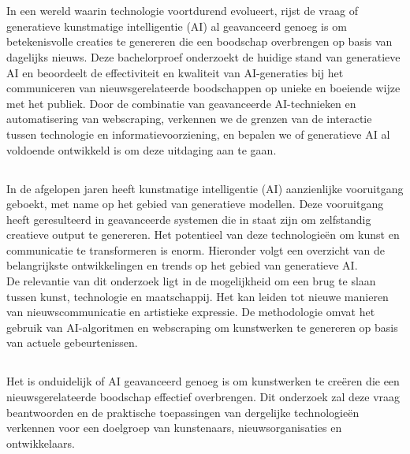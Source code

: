 
\chapter{}%
\label{ch:inleiding}

\noindent
In een wereld waarin technologie voortdurend evolueert, rijst de vraag of generatieve kunstmatige intelligentie (AI) al geavanceerd genoeg is om betekenisvolle creaties te genereren die een boodschap overbrengen op basis van dagelijks nieuws. Deze bachelorproef onderzoekt de huidige stand van generatieve AI en beoordeelt de effectiviteit en kwaliteit van AI-generaties bij het communiceren van nieuwsgerelateerde boodschappen op unieke en boeiende wijze met het publiek. Door de combinatie van geavanceerde AI-technieken en automatisering van webscraping, verkennen we de grenzen van de interactie tussen technologie en informatievoorziening, en bepalen we of generatieve AI al voldoende ontwikkeld is om deze uitdaging aan te gaan.
\pagebreak


\section{}%
\label{sec:context}
\noindent
In de afgelopen jaren heeft kunstmatige intelligentie (AI) aanzienlijke vooruitgang geboekt, met name op het gebied van generatieve modellen. Deze vooruitgang heeft geresulteerd in geavanceerde systemen die in staat zijn om zelfstandig creatieve output te genereren. Het potentieel van deze technologieën om kunst en communicatie te transformeren is enorm. Hieronder volgt een overzicht van de belangrijkste ontwikkelingen en trends op het gebied van generatieve AI. \\

\noindent
De relevantie van dit onderzoek ligt in de mogelijkheid om een brug te slaan tussen kunst, technologie en maatschappij. Het kan leiden tot nieuwe manieren van nieuwscommunicatie en artistieke expressie. De methodologie omvat het gebruik van AI-algoritmen en webscraping om kunstwerken te genereren op basis van actuele gebeurtenissen.


\section{}%
\label{sec:probleemstelling}
\noindent
Het is onduidelijk of AI geavanceerd genoeg is om kunstwerken te creëren die een nieuwsgerelateerde boodschap effectief overbrengen. Dit onderzoek zal deze vraag beantwoorden en de praktische toepassingen van dergelijke technologieën verkennen voor een doelgroep van kunstenaars, nieuwsorganisaties en ontwikkelaars.

